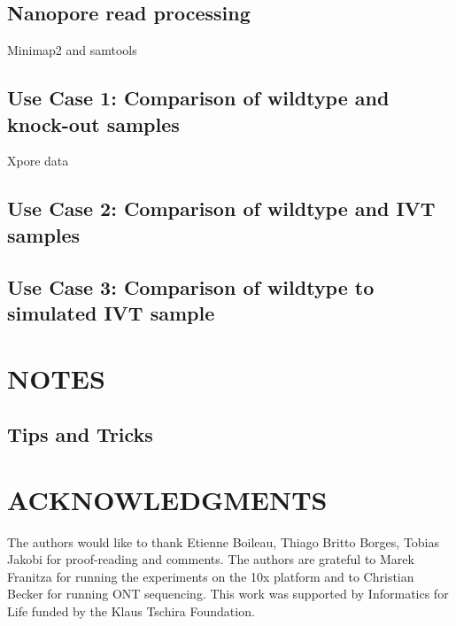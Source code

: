 \documentclass[times, 11pt, a4paper]{article}
\begin{document}
\subsection*{Nanopore read processing}
Minimap2 and samtools
\subsection*{Use Case 1: Comparison of wildtype and knock-out samples}
Xpore data
\subsection*{Use Case 2: Comparison of wildtype and IVT samples}
\subsection*{Use Case 3: Comparison of wildtype to simulated IVT sample}

\section*{NOTES}
\subsection*{Tips and Tricks}

\section*{ACKNOWLEDGMENTS}
  The authors would like to thank Etienne Boileau, Thiago Britto Borges, Tobias Jakobi for proof-reading and comments.
  The authors are grateful to Marek Franitza for running the experiments on the 10x platform and to Christian Becker for running ONT sequencing.
  This work was supported by Informatics for Life funded by the Klaus Tschira Foundation.
\end{document}
